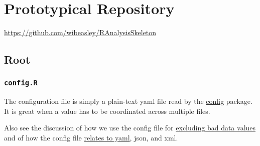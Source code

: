 \documentclass[
]{book}
\begin{document}
\hypertarget{repo-prototype}{%
\chapter{Prototypical Repository}\label{repo-prototype}}

\url{https://github.com/wibeasley/RAnalysisSkeleton}

\hypertarget{repo-root}{%
\section{Root}\label{repo-root}}

\hypertarget{repo-config}{%
\subsection{\texorpdfstring{\texttt{config.R}}{config.R}}\label{repo-config}}

The configuration file is simply a plain-text yaml file read by the \href{https://CRAN.R-project.org/package=config}{config} package. It is great when a value has to be coordinated across multiple files.

Also see the discussion of how we use the config file for \href{https://ouhscbbmc.github.io/data-science-practices-1/coding.html\#excluding-bad-cases}{excluding bad data values} and of how the config file \protect\hyperlink{data-containers-yaml}{relates to yaml}, json, and xml.
\end{document}
